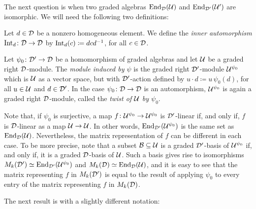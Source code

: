 The next question is when two graded algebras $\operatorname{End}_{\mathcal{D}} (\mathcal U)$ and $\operatorname{End}_{\mathcal{D}'} (\mathcal U')$ are isomorphic. 
We will need the following two definitions:

\begin{defi}\label{def:inner-automorphism}
	Let $d\in \mathcal{D}$ be a nonzero homogeneous element.
	We define the \emph{inner automorphism} $\operatorname{Int}_d\colon \mathcal{D} \to \mathcal{D}$ by $\operatorname{Int}_d (c) \coloneqq dcd^{-1}$, for all $c\in \mathcal{D}$.
\end{defi}

\begin{defi}\label{def:twist}
	Let $\psi_0\colon \mathcal{D}' \to \mathcal{D}$ be a homomorphism of graded algebras and let $\mathcal U$ be a graded right $\mathcal{D}$-module.
	The \emph{module induced by $\psi$} is the graded right $\mathcal{D}'$-module $\mathcal U^{\psi_0}$ which is $\mathcal U$ as a vector space, but with $\mathcal{D}'$-action defined by $u\cdot d \coloneqq u\,\psi_0 (d)$, for all $u\in \mathcal U$ and $d\in \mathcal{D}'$.
	In the case $\psi_0\colon \mathcal{D} \to \mathcal{D}$ is an automorphism, $\mathcal U^{\psi_0}$ is again a graded right $\mathcal{D}$-module, called the \emph{twist of $\mathcal U$ by $\psi_0$}.
\end{defi}

\begin{remark}\label{rmk:twist-does-not-change-set}
	Note that, if $\psi_0$ is surjective, a map $f\colon \mathcal U^{\psi_0} \to \mathcal U^{\psi_0}$ is $\mathcal{D}'$-linear if, and only if, $f$ is $\mathcal{D}$-linear as a map $\mathcal U\to \mathcal U$. 
	In other words, $\operatorname{End}_{\mathcal{D}'} (\mathcal U^{\psi_0})$ is the same set as $\operatorname{End}_{\mathcal{D}} (\mathcal U)$. 
	Nevertheless, the matrix representation of $f$ can be different in each case. 
	To be more precise, note that a subset $\mathcal B \subseteq \mathcal U$ is a graded $\mathcal{D}'$-basis of $\mathcal U^{\psi_0}$ if, and only if, it is a graded $\mathcal{D}$-basis of $\mathcal U$. 
	Such a basis gives rise to isomorphisms $M_k(\mathcal{D}') \simeq \operatorname{End}_{\mathcal{D}'} (\mathcal U^{\psi_0})$ and $M_k(\mathcal{D}) \simeq \operatorname{End}_{\mathcal{D}} (\mathcal U)$, and it is easy to see that the matrix representing $f$ in $M_k(\mathcal{D}')$ is equal to the result of applying $\psi_0$ to every entry of the matrix representing $f$ in $M_k(\mathcal{D})$.
\end{remark}

The next result is \cite[Theorem 2.10]{livromicha} with a slightly different notation:

